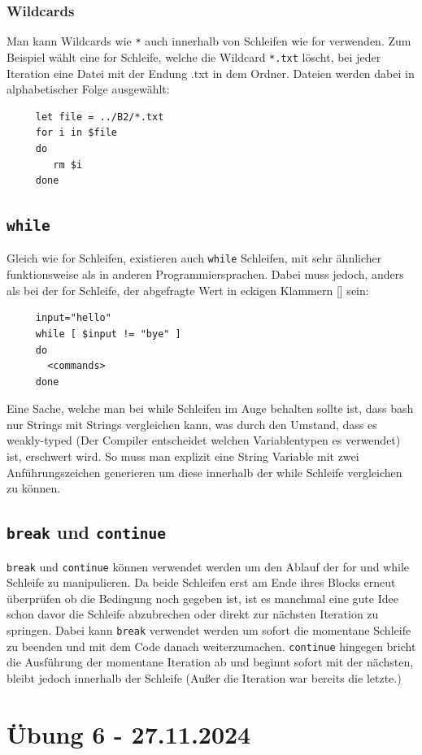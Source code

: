 \documentclass{article}
\begin{document}
	 \subsubsection{Wildcards}
	 Man kann Wildcards wie \verb|*| auch innerhalb von Schleifen wie for verwenden. Zum Beispiel wählt eine for Schleife, welche die Wildcard \verb|*.txt| löscht, bei jeder Iteration eine Datei mit der Endung .txt in dem Ordner. Dateien werden dabei in alphabetischer Folge ausgewählt:
	 \begin{verbatim}
	 let file = ../B2/*.txt
	 for i in $file
	 do
	 	rm $i
	 done
	 \end{verbatim}
	 \cprotect\subsection{\verb|while|}
	 Gleich wie for Schleifen, existieren auch \verb|while| Schleifen, mit sehr ähnlicher funktionsweise als in anderen Programmiersprachen. Dabei muss jedoch, anders als bei der for Schleife, der abgefragte Wert in eckigen Klammern [] sein:
	 \begin{verbatim}
	 input="hello"
	 while [ $input != "bye" ]
	 do 
       <commands>
	 done
	 \end{verbatim}
	 Eine Sache, welche man bei while Schleifen im Auge behalten sollte ist, dass bash nur Strings mit Strings vergleichen kann, was durch den Umstand, dass es weakly-typed (Der Compiler entscheidet welchen Variablentypen es verwendet) ist, erschwert wird. So muss man explizit eine String Variable mit zwei Anführungszeichen generieren um diese innerhalb der while Schleife vergleichen zu können.
	\cprotect\subsection{\verb|break| und \verb|continue|}
	\verb|break| und \verb|continue| können verwendet werden um den Ablauf der for und while Schleife zu manipulieren. Da beide Schleifen erst am Ende ihres Blocks erneut überprüfen ob die Bedingung noch gegeben ist, ist es manchmal eine gute Idee schon davor die Schleife abzubrechen oder direkt zur nächsten Iteration zu springen. Dabei kann \verb|break| verwendet werden um sofort die momentane Schleife zu beenden und mit dem Code danach weiterzumachen. \verb|continue| hingegen bricht die Ausführung der momentane Iteration ab und beginnt sofort mit der nächsten, bleibt jedoch innerhalb der Schleife (Außer die Iteration war bereits die letzte.)
	\section{Übung 6 - 27.11.2024}
\end{document}
